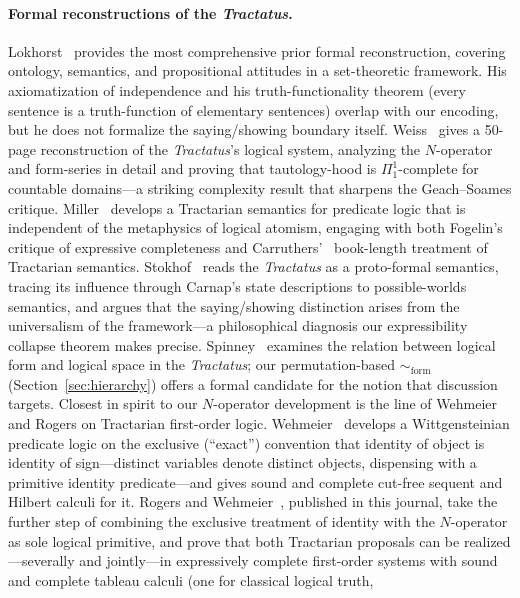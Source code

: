\documentclass[jsl,bibother]{asl}
\theoremstyle{definition}
\theoremstyle{remark}
\newcommand{\formEq}{\sim_{\mathrm{form}}}
\begin{document}
\paragraph{Formal reconstructions of the \emph{Tractatus}.}
Lokhorst~\cite{lokhorst1988} provides the most comprehensive
prior formal reconstruction, covering ontology, semantics, and
propositional attitudes in a set-theoretic framework.  His
axiomatization of independence and his truth-functionality
theorem (every sentence is a truth-function of elementary
sentences) overlap with our encoding, but he does not formalize
the saying/showing boundary itself.
Weiss~\cite{weiss2017} gives a 50-page reconstruction of the
\emph{Tractatus}'s logical system, analyzing the $N$-operator
and form-series in detail and proving that tautology-hood is
$\Pi^1_1$-complete for countable domains---a striking
complexity result that sharpens the Geach--Soames critique.
Miller~\cite{miller1995} develops a Tractarian semantics for
predicate logic that is independent of the metaphysics of
logical atomism, engaging with both Fogelin's~\cite{fogelin1987}
critique of expressive completeness and Carruthers'~\cite{carruthers1989}
book-length treatment of Tractarian semantics.
Stokhof~\cite{stokhof2008} reads the \emph{Tractatus} as a
proto-formal semantics, tracing its influence through Carnap's
state descriptions to possible-worlds semantics, and argues
that the saying/showing distinction arises from the
universalism of the framework---a philosophical diagnosis our
expressibility collapse theorem makes precise.
Spinney~\cite{spinney2022} examines the relation between logical
form and logical space in the \emph{Tractatus}; our
permutation-based $\formEq$ (Section~\ref{sec:hierarchy})
offers a formal candidate for the notion that discussion
targets.
Closest in spirit to our $N$-operator development is the line
of Wehmeier and Rogers on Tractarian first-order logic.
Wehmeier~\cite{wehmeier2004} develops a Wittgensteinian
predicate logic on the exclusive (``exact'') convention that
identity of object is identity of sign---distinct variables
denote distinct objects, dispensing with a primitive identity
predicate---and gives sound and complete cut-free sequent and
Hilbert calculi for it.  Rogers and Wehmeier~\cite{rogers2012},
published in this journal, take the further step of combining
the exclusive treatment of identity with the $N$-operator as
sole logical primitive, and prove that both Tractarian
proposals can be realized---severally and jointly---in
expressively complete first-order systems with sound and
complete tableau calculi (one for classical logical truth,
\end{document}
